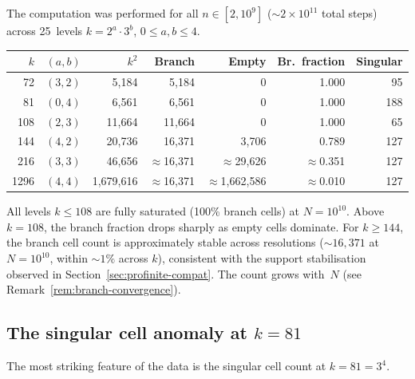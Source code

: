 \documentclass[11pt,a4paper]{article}
\theoremstyle{plain}
\theoremstyle{definition}
\begin{document}
The computation was performed for all $n \in [2, 10^9]$
(${\sim}2 \times 10^{11}$ total steps) across 25~levels
$k = 2^a \cdot 3^b$, $0 \leq a, b \leq 4$.

\begin{empirical}\label{obs:branch-frac}
    \begin{center}
    \renewcommand{\arraystretch}{1.15}
    \begin{tabular}{rrrrrrr}
        \toprule
        $k$ & $(a,b)$ & $k^2$ & Branch & Empty & Br.\ fraction & Singular \\
        \midrule
        72 & $(3,2)$ & 5{,}184 & 5{,}184 & 0 & 1.000 & 95 \\
        81 & $(0,4)$ & 6{,}561 & 6{,}561 & 0 & 1.000 & 188 \\
        108 & $(2,3)$ & 11{,}664 & 11{,}664 & 0 & 1.000 & 65 \\
        144 & $(4,2)$ & 20{,}736 & 16{,}371 & 3{,}706 & 0.789 & 127 \\
        216 & $(3,3)$ & 46{,}656 & $\approx$16{,}371 & $\approx$29{,}626 & $\approx$0.351 & 127 \\
        1296 & $(4,4)$ & 1{,}679{,}616 & $\approx$16{,}371 & $\approx$1{,}662{,}586 & $\approx$0.010 & 127 \\
        \bottomrule
    \end{tabular}
    \end{center}
    All levels $k \leq 108$ are fully saturated (100\% branch cells)
    at $N = 10^{10}$.
    Above $k = 108$, the branch fraction drops sharply as empty cells
    dominate.  For $k \geq 144$, the branch cell count is approximately
    stable across resolutions (${\sim}16{,}371$ at $N = 10^{10}$, within
    ${\sim}1\%$ across $k$), consistent with the support stabilisation
    observed in Section~\ref{sec:profinite-compat}.  The count grows
    with~$N$ (see Remark~\ref{rem:branch-convergence}).
\end{empirical}


\subsection{The singular cell anomaly at $k = 81$}

The most striking feature of the data is the singular cell count at
$k = 81 = 3^4$.
\end{document}

